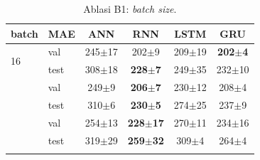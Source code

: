 \begin{table}[t]
\centering
\scriptsize
\caption{Ablasi B1: \textit{batch size}.}
\label{tab:B1}
\setlength{\tabcolsep}{3pt}
\begin{tabular}{@{}llcccc@{}}
\toprule
batch & MAE & ANN & RNN & LSTM & GRU \\
\midrule
\multirow{2}{*}{16} & val & 245$\pm$17 & 202$\pm$9 & 209$\pm$19 & \textbf{202$\pm$4} \\
 & test & 308$\pm$18 & \textbf{228$\pm$7} & 249$\pm$35 & 232$\pm$10 \\
\addlinespace[1pt]
\multirow{2}{*}{64} & val & 249$\pm$9 & \textbf{206$\pm$7} & 230$\pm$12 & 208$\pm$4 \\
 & test & 310$\pm$6 & \textbf{230$\pm$5} & 274$\pm$25 & 237$\pm$9 \\
\addlinespace[1pt]
\multirow{2}{*}{256} & val & 254$\pm$13 & \textbf{228$\pm$17} & 270$\pm$11 & 234$\pm$16 \\
 & test & 319$\pm$29 & \textbf{259$\pm$32} & 309$\pm$4 & 264$\pm$4 \\
\addlinespace[1pt]
\bottomrule
\end{tabular}
\end{table}